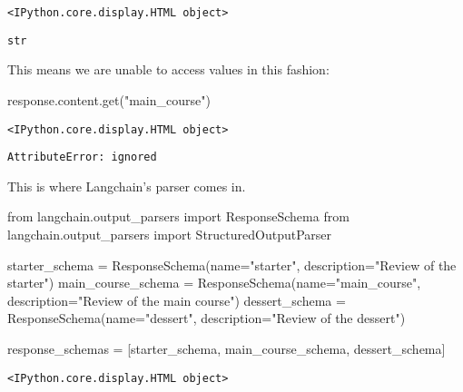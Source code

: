 \documentclass[
  letterpaper,
  DIV=11,
  numbers=noendperiod]{scrreprt}
\newenvironment{Shaded}{\begin{snugshade}}{\end{snugshade}}
\newcommand{\ImportTok}[1]{\textcolor[rgb]{0.00,0.46,0.62}{#1}}
\newcommand{\NormalTok}[1]{\textcolor[rgb]{0.00,0.23,0.31}{#1}}
\newcommand{\OperatorTok}[1]{\textcolor[rgb]{0.37,0.37,0.37}{#1}}
\newcommand{\StringTok}[1]{\textcolor[rgb]{0.13,0.47,0.30}{#1}}
\begin{document}
\begin{verbatim}
<IPython.core.display.HTML object>
\end{verbatim}

\begin{verbatim}
str
\end{verbatim}

This means we are unable to access values in this fashion:

\begin{Shaded}
\begin{Highlighting}[]
\NormalTok{response.content.get(}\StringTok{"main\_course"}\NormalTok{)}
\end{Highlighting}
\end{Shaded}

\begin{verbatim}
<IPython.core.display.HTML object>
\end{verbatim}

\begin{verbatim}
AttributeError: ignored
\end{verbatim}

This is where Langchain's parser comes in.

\begin{Shaded}
\begin{Highlighting}[]
\ImportTok{from}\NormalTok{ langchain.output\_parsers }\ImportTok{import}\NormalTok{ ResponseSchema}
\ImportTok{from}\NormalTok{ langchain.output\_parsers }\ImportTok{import}\NormalTok{ StructuredOutputParser}

\NormalTok{starter\_schema }\OperatorTok{=}\NormalTok{ ResponseSchema(name}\OperatorTok{=}\StringTok{"starter"}\NormalTok{, description}\OperatorTok{=}\StringTok{"Review of the starter"}\NormalTok{)}
\NormalTok{main\_course\_schema }\OperatorTok{=}\NormalTok{ ResponseSchema(name}\OperatorTok{=}\StringTok{"main\_course"}\NormalTok{, description}\OperatorTok{=}\StringTok{"Review of the main course"}\NormalTok{)}
\NormalTok{dessert\_schema }\OperatorTok{=}\NormalTok{ ResponseSchema(name}\OperatorTok{=}\StringTok{"dessert"}\NormalTok{, description}\OperatorTok{=}\StringTok{"Review of the dessert"}\NormalTok{)}

\NormalTok{response\_schemas }\OperatorTok{=}\NormalTok{ [starter\_schema, main\_course\_schema, dessert\_schema]}
\end{Highlighting}
\end{Shaded}

\begin{verbatim}
<IPython.core.display.HTML object>
\end{verbatim}
\end{document}
